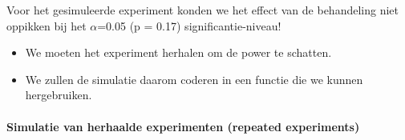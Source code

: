 \documentclass[
]{article}
\providecommand{\tightlist}{%
  \setlength{\itemsep}{0pt}\setlength{\parskip}{0pt}}
\begin{document}
Voor het gesimuleerde experiment konden we het effect van de behandeling
niet oppikken bij het \(\alpha\)=0.05 (p = 0.17) significantie-niveau!

\begin{itemize}
\tightlist
\item
  We moeten het experiment herhalen om de power te schatten.
\item
  We zullen de simulatie daarom coderen in een functie die we kunnen
  hergebruiken.
\end{itemize}

\hypertarget{simulatie-van-herhaalde-experimenten-repeated-experiments}{%
\paragraph{Simulatie van herhaalde experimenten (repeated
experiments)}\label{simulatie-van-herhaalde-experimenten-repeated-experiments}}
\end{document}
